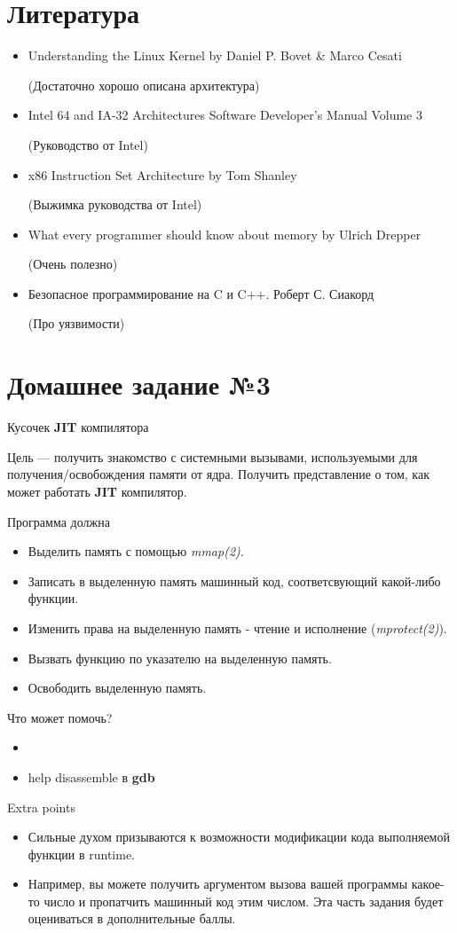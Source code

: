 \documentclass[../../lectures.tex]{subfiles}
\begin{document}
\section{Литература}
\begin{itemize}
    \item Understanding the Linux Kernel by Daniel P. Bovet \& Marco Cesati

          (Достаточно хорошо описана архитектура)
    \item Intel 64 and IA-32 Architectures Software Developer's Manual Volume 3

          (Руководство от Intel)
    \item x86 Instruction Set Architecture by Tom Shanley

          (Выжимка руководства от Intel)
    \item What every programmer should know about memory by Ulrich Drepper

          (Очень полезно)
    \item Безопасное программирование на C и C++. Роберт С. Сиакорд

          (Про уязвимости)
\end{itemize}

\section{Домашнее задание №3}
Кусочек \textbf{JIT} компилятора

Цель --- получить знакомство с системными вызывами, используемыми для получения/освобождения
памяти от ядра. Получить представление о том, как может работать \textbf{JIT} компилятор.

Программа должна
\begin{itemize}
    \item Выделить память с помощью \emph{mmap(2)}.
    \item Записать в выделенную память машинный код, соответсвующий какой-либо функции.
    \item Изменить права на выделенную память - чтение и исполнение (\emph{mprotect(2)}).
    \item Вызвать функцию по указателю на выделенную память.
    \item Освободить выделенную память.
\end{itemize}

Что может помочь?
\begin{itemize}
    \item {}
    \item help disassemble в \textbf{gdb}
\end{itemize}

Extra points
\begin{itemize}
    \item Сильные духом призываются к возможности модификации кода выполняемой функции
          в runtime. 
    \item Например, вы можете получить аргументом вызова вашей программы
          какое-то число и пропатчить машинный код этим числом. Эта часть задания будет
          оцениваться в дополнительные баллы.
\end{itemize}
\end{document}
